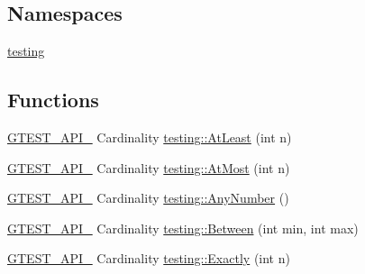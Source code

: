 \subsection*{Namespaces}
\begin{DoxyCompactItemize}
\item 
 \hyperlink{namespacetesting}{testing}
\end{DoxyCompactItemize}
\subsection*{Functions}
\begin{DoxyCompactItemize}
\item 
\hyperlink{gtest-port_8h_aa73be6f0ba4a7456180a94904ce17790}{G\+T\+E\+S\+T\+\_\+\+A\+P\+I\+\_\+} Cardinality \hyperlink{namespacetesting_a137297cb3c582843989fbd937cf0fed2}{testing\+::\+At\+Least} (int n)
\item 
\hyperlink{gtest-port_8h_aa73be6f0ba4a7456180a94904ce17790}{G\+T\+E\+S\+T\+\_\+\+A\+P\+I\+\_\+} Cardinality \hyperlink{namespacetesting_a5487cd1068c78821ced96fbf542a91bb}{testing\+::\+At\+Most} (int n)
\item 
\hyperlink{gtest-port_8h_aa73be6f0ba4a7456180a94904ce17790}{G\+T\+E\+S\+T\+\_\+\+A\+P\+I\+\_\+} Cardinality \hyperlink{namespacetesting_aa1f8a6371097e1e9b8d6866020f35252}{testing\+::\+Any\+Number} ()
\item 
\hyperlink{gtest-port_8h_aa73be6f0ba4a7456180a94904ce17790}{G\+T\+E\+S\+T\+\_\+\+A\+P\+I\+\_\+} Cardinality \hyperlink{namespacetesting_a3bb2d3cdd3fdf5b4be1480fce549918e}{testing\+::\+Between} (int min, int max)
\item 
\hyperlink{gtest-port_8h_aa73be6f0ba4a7456180a94904ce17790}{G\+T\+E\+S\+T\+\_\+\+A\+P\+I\+\_\+} Cardinality \hyperlink{namespacetesting_aa9b1b32ba9e8d3db8ac0af0fc8785c8d}{testing\+::\+Exactly} (int n)
\end{DoxyCompactItemize}
